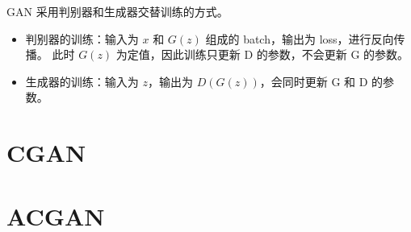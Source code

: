 GAN 采用判别器和生成器交替训练的方式。

\begin{itemize}
  \item 判别器的训练：输入为 $x$ 和 $G(z)$ 组成的 batch，输出为 loss，进行反向传播。
    此时 $G(z)$ 为定值，因此训练只更新 D 的参数，不会更新 G 的参数。
  \item 生成器的训练：输入为 $z$，输出为 $D(G(z))$，会同时更新 G 和 D 的参数。
\end{itemize}

\section{CGAN}

\section{ACGAN}

